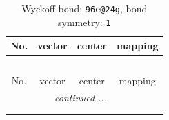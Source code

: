\documentclass[fleqn,8pt]{jsarticle}
\begin{document}
\renewcommand{\arraystretch}{1.2}
\begin{longtable}{cccc}
\caption{Wyckoff bond: {\tt 96e@24g}, bond symmetry: {\tt 1}}
 \\
 \hline \hline
No. & vector & center & mapping \\ \hline \endfirsthead

\multicolumn{3}{l}{\tablename\ \thetable{}} \\
 \hline \hline
No. & vector & center & mapping \\ \hline \endhead

 \hline \hline
\multicolumn{3}{r}{\footnotesize\it continued ...} \\ \endfoot

 \hline \hline
\multicolumn{3}{r}{} \\ \endlastfoot


\end{longtable}
\end{document}
